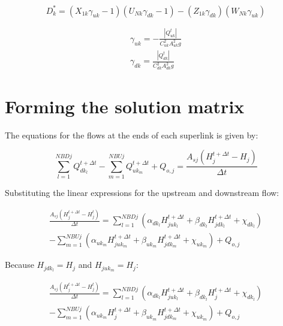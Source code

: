 \documentclass[11pt]{article}
\begin{document}
\begin{equation}
  D_k^* = (X_{1k} \gamma_{uk} - 1)(U_{Nk} \gamma_{dk} - 1) - (Z_{1k} \gamma_{dk})(W_{Nk} \gamma_{uk})
\end{equation}

\begin{align}
  \gamma_{uk} = -\frac{|Q_{uk}^{t}|}{C_{uk}^2 A_{uk}^2 g} \\
  \gamma_{dk} = \frac{|Q_{dk}^{t}|}{C_{dk}^2 A_{dk}^2 g}
\end{align}

\section*{Forming the solution matrix}

The equations for the flows at the ends of each superlink is given by:

\begin{equation}
  \sum_{l=1}^{NBDj} Q_{dk_l}^{t + \Delta t} - \sum_{m=1}^{NBUj} Q_{uk_m}^{t + \Delta t} + Q_{o,j} = \frac{A_{sj} (H_j^{t + \Delta t} - H_j)}{\Delta t}
\end{equation}

Substituting the linear expressions for the upstream and downstream flow:

\begin{equation}
  \begin{split}
    \frac{A_{sj} (H_j^{t + \Delta t} - H_j^t)}{\Delta t} =
    \sum_{l=1}^{NBDj} (\alpha_{dk_l} H_{juk_l}^{t + \Delta t} + \beta_{dk_l}
    H_{jdk_l}^{t + \Delta t} + \chi_{dk_l}) \\
    - \sum_{m=1}^{NBUj} (\alpha_{uk_m}
    H_{juk_m}^{t + \Delta t} + \beta_{uk_m} H_{jdk_m}^{t + \Delta t} + \chi_{uk_m}) +
    Q_{o,j}
  \end{split}
\end{equation}

Because $H_{jdk_l} = H_j$ and $H_{juk_m} = H_j$:

\begin{equation}
  \begin{split}
    \frac{A_{sj} (H_j^{t + \Delta t} - H_j^t)}{\Delta t} =
    \sum_{l=1}^{NBDj} (\alpha_{dk_l} H_{juk_l}^{t + \Delta t} + \beta_{dk_l}
    H_{j}^{t + \Delta t} + \chi_{dk_l})\\
    - \sum_{m=1}^{NBUj} (\alpha_{uk_m}
    H_{j}^{t + \Delta t} + \beta_{uk_m} H_{jdk_m}^{t + \Delta t} + \chi_{uk_m}) +
    Q_{o,j}
  \end{split}
\end{equation}
\end{document}
